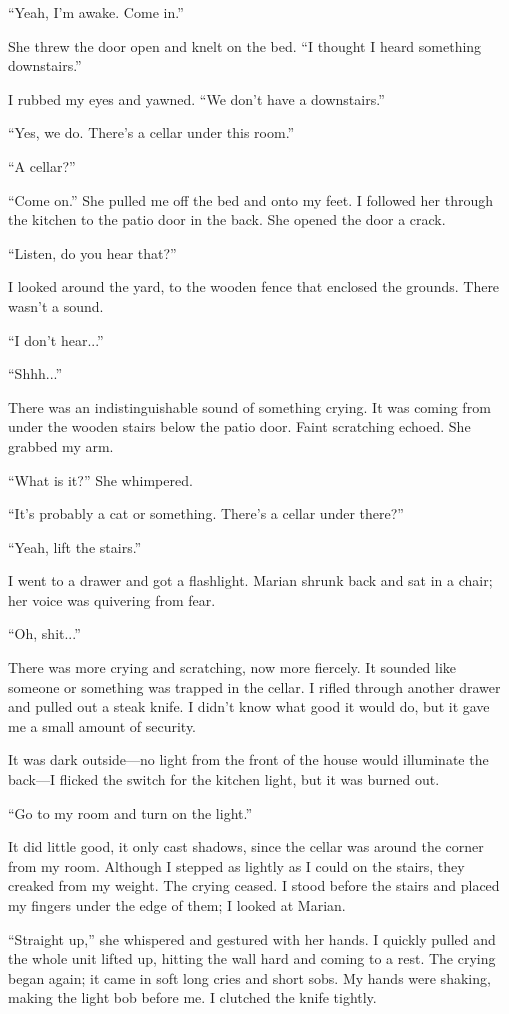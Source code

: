 ``Yeah, I'm awake. Come in.''

She threw the door open and knelt on the bed. ``I thought I heard
something downstairs.''

I rubbed my eyes and yawned. ``We don't have a downstairs.''

``Yes, we do. There's a cellar under this room.''

``A cellar?''

``Come on.'' She pulled me off the bed and onto my feet. I followed her
through the kitchen to the patio door in the back. She opened the door a
crack.

``Listen, do you hear that?''

I looked around the yard, to the wooden fence that enclosed the grounds.
There wasn't a sound.

``I don't hear...''

``Shhh...''

There was an indistinguishable sound of something crying. It was coming
from under the wooden stairs below the patio door. Faint scratching
echoed. She grabbed my arm.

``What is it?'' She whimpered.

``It's probably a cat or something. There's a cellar under there?''

``Yeah, lift the stairs.''

I went to a drawer and got a flashlight. Marian shrunk back and sat in a
chair; her voice was quivering from fear.

``Oh, shit...''

There was more crying and scratching, now more fiercely. It sounded like
someone or something was trapped in the cellar. I rifled through another
drawer and pulled out a steak knife. I didn't know what good it would
do, but it gave me a small amount of security.

It was dark outside---no light from the front of the house would
illuminate the back---I flicked the switch for the kitchen light, but it
was burned out.

``Go to my room and turn on the light.''

It did little good, it only cast shadows, since the cellar was around
the corner from my room. Although I stepped as lightly as I could on the
stairs, they creaked from my weight. The crying ceased. I stood before
the stairs and placed my fingers under the edge of them; I looked at
Marian.

``Straight up,'' she whispered and gestured with her hands. I quickly
pulled and the whole unit lifted up, hitting the wall hard and coming to
a rest. The crying began again; it came in soft long cries and short
sobs. My hands were shaking, making the light bob before me. I clutched
the knife tightly.

